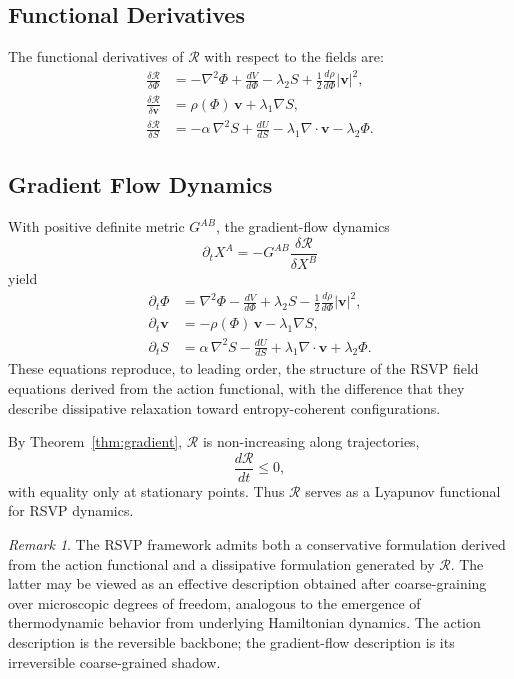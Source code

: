 \documentclass[12pt,a4paper]{article}
\theoremstyle{plain}
\theoremstyle{definition}
\theoremstyle{remark}
\newtheorem{remark}{Remark}
\begin{document}
\subsection{Functional Derivatives}

The functional derivatives of $\mathcal{R}$ with respect to the
fields are:
\begin{align}
\frac{\delta \mathcal{R}}{\delta \Phi} &=
-\nabla^2 \Phi + \frac{dV}{d\Phi}
- \lambda_2 S
+ \frac{1}{2}\frac{d\rho}{d\Phi}|\mathbf{v}|^2, \\
\frac{\delta \mathcal{R}}{\delta \mathbf{v}} &=
\rho(\Phi)\,\mathbf{v} + \lambda_1 \nabla S, \\
\frac{\delta \mathcal{R}}{\delta S} &=
-\alpha\,\nabla^2 S + \frac{dU}{dS}
- \lambda_1 \nabla \cdot \mathbf{v}
- \lambda_2 \Phi.
\end{align}

\subsection{Gradient Flow Dynamics}

With positive definite metric $G^{AB}$, the gradient-flow dynamics
\begin{equation}
\partial_t X^A = -G^{AB}\frac{\delta \mathcal{R}}{\delta X^B}
\end{equation}
yield
\begin{align}
\partial_t \Phi &= \nabla^2 \Phi - \frac{dV}{d\Phi}
+ \lambda_2 S
- \frac{1}{2}\frac{d\rho}{d\Phi}|\mathbf{v}|^2, \\
\partial_t \mathbf{v} &= -\rho(\Phi)\,\mathbf{v} - \lambda_1 \nabla S, \\
\partial_t S &= \alpha\,\nabla^2 S - \frac{dU}{dS}
+ \lambda_1 \nabla \cdot \mathbf{v} + \lambda_2 \Phi.
\end{align}
These equations reproduce, to leading order, the structure of the RSVP
field equations derived from the action functional, with the difference
that they describe dissipative relaxation toward entropy-coherent
configurations.

By Theorem~\ref{thm:gradient}, $\mathcal{R}$ is non-increasing along
trajectories,
\begin{equation}
\frac{d\mathcal{R}}{dt} \leq 0,
\end{equation}
with equality only at stationary points. Thus $\mathcal{R}$ serves as
a Lyapunov functional for RSVP dynamics.

\begin{remark}
The RSVP framework admits both a conservative formulation derived from
the action functional and a dissipative formulation generated by
$\mathcal{R}$. The latter may be viewed as an effective description
obtained after coarse-graining over microscopic degrees of freedom,
analogous to the emergence of thermodynamic behavior from underlying
Hamiltonian dynamics. The action description is the reversible backbone;
the gradient-flow description is its irreversible coarse-grained
shadow.
\end{remark}
\end{document}
